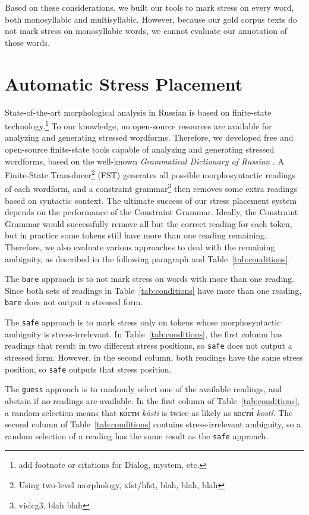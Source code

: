 \documentclass[11pt]{article}
\newcommand{\rus}[1]{\foreignlanguage{russian}{#1}}
\begin{document}
Based on these considerations, we built our tools to mark stress on every
word, both monosyllabic and multisyllabic. However, because our gold corpus texts 
do not mark stress on monosyllabic words, we cannot evaluate our annotation of 
those words.

\section{Automatic Stress Placement}

State-of-the-art morphological analysis in Russian is based on finite-state
technology.\footnote{add footnote or citations for Dialog, mystem, etc.} To our 
knowledge, no open-source resources are available for analyzing and generating 
stressed wordforms. Therefore, we developed free and open-source finite-state 
tools capable of analyzing and generating stressed wordforms, based on the
well-known \emph{Grammatical Dictionary of Russian} \cite{Zaliznjak-77}.
A Finite-State Transducer\footnote{Using two-level 
morphology, xfst/hfst, blah, blah, blah} (FST) generates all possible 
morphosyntactic readings of each wordform, and a constraint grammar\footnote{vislcg3, blah blah} then removes
some extra readings based on syntactic context. The ultimate success of our 
stress placement system depends on the performance of the Constraint Grammar. 
Ideally, the Constraint Grammar would successfully remove all but the correct 
reading for each token, but in practice some
tokens still have more than one reading remaining. Therefore,
we also evaluate various approaches to deal with the remaining ambiguity,
as described in the following paragraph and Table~\ref{tab:conditions}.

The {\small {\tt bare}} approach is to not mark stress on words with more than 
one reading. Since both sets of readings in Table~\ref{tab:conditions} have more
than one reading, {\small {\tt bare}} does not output a stressed form. 

The {\small {\tt safe}} approach is to mark stress only on
tokens whose morphosyntactic ambiguity is stress-irrelevant. In 
Table~\ref{tab:conditions}, the first column has readings that result in two
different stress positions, so {\small {\tt safe}} does not output a stressed
form. However, in the second column, both readings have the same stress position, 
so {\small {\tt safe}} outputs that stress position.

The {\small {\tt guess}} approach is to randomly select one of the available 
readings, and abstain if no readings are available. In the first column of
Table~\ref{tab:conditions}, a random selection means that \rus{к\'{о}сти} 
\emph{k\'{o}sti} is twice as likely as \rus{кост\'{и}} \emph{kost\'{i}}. The
second column of Table~\ref{tab:conditions} contains stress-irrelevant
ambiguity, so a random selection of a reading has the same result as the
{\small {\tt safe}} approach.
 
\end{document}

